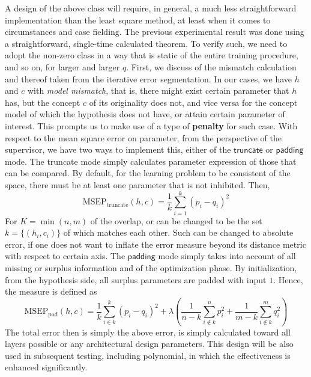 A design of the above class will require, in general, a much less straightforward implementation than the least square method, at least when it comes to circumstances and case fielding. The previous experimental result was done using a straightforward, single-time calculated theorem. To verify such, we need to adopt the non-zero class in a way that is static of the entire training procedure, and so on, for larger and larger $q$. First, we discuss of the mismatch calculation and thereof taken from the iterative error segmentation. In our cases, we have $h$ and $c$ with \textit{model mismatch}, that is, there might exist certain parameter that $h$ has, but the concept $c$ of its originality does not, and vice versa for the concept model of which the hypothesis does not have, or attain certain parameter of interest. This prompts us to make use of a type of \textbf{penalty} for such case. With respect to the mean square error on parameter, from the perspective of the supervisor, we have two ways to implement this, either of the $\mathsf{truncate}$ or $\mathsf{padding}$ mode. The truncate mode simply calculates parameter expression of those that can be compared. By default, for the learning problem to be consistent of the space, there must be at least one parameter that is not inhibited. Then, 
\begin{equation}
    \mathrm{MSEP}_{\text{truncate}}(h,c) = \frac{1}{k} \sum^{k}_{i=1}(p_{i}-q_{i})^{2}
\end{equation}
For $K=\min(n,m)$ of the overlap, or can be changed to be the set $k=\{(h_{i},c_{i})\}$ of which matches each other. Such can be changed to absolute error, if one does not want to inflate the error measure beyond its distance metric with respect to certain axis. The $\mathsf{padding}$ mode simply takes into account of all missing or surplus information and of the optimization phase. By initialization, from the hypothesis side, all surplus parameters are padded with input $1$. Hence, the measure is defined as 
\begin{equation}\label{eq:parameter_penalty}
    \mathrm{MSEP}_{\text{pad}}(h,c) = \frac{1}{k} \sum^{k}_{i\in k} (p_{i}-q_{i})^{2} + \lambda \left(\frac{1}{n-k}\sum^{n}_{i\not\in k}p_{i}^{2}+ \frac{1}{m-k}\sum^{m}_{i\not\in k}q_{i}^{2}\right)
\end{equation}
The total error then is simply the above error, is simply calculated toward all layers possible or any architectural design parameters. This design will be also used in subsequent testing, including polynomial, in which the effectiveness is enhanced significantly. 



